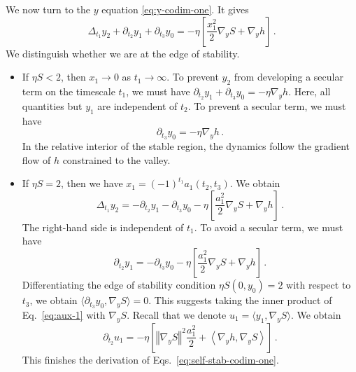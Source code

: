 \documentclass[11pt,english,reqno]{article}
\theoremstyle{plain}
\theoremstyle{definition}
\theoremstyle{remark}
\numberwithin{equation}{section}
\begin{document}
        We now turn to the $y$ equation \eqref{eq:y-codim-one}. It gives
        \begin{equation*}
            \Delta_{t_1} y_2 + \partial_{t_2} y_1 + \partial_{t_3} y_0 = - \eta \left[\frac{x_1^2}{2} \nabla_y S + \nabla_y h\right] \, .
        \end{equation*}
        We distinguish whether we are at the edge of stability.
        \begin{itemize}
            \item If $\eta S < 2$, then $x_1 \to 0$ as $t_1 \to \infty$. To prevent $y_2$ from developing a secular term on the timescale $t_1$, we must have
                $\partial_{t_2} y_1 + \partial_{t_3} y_0 = - \eta \nabla_y h$.
            Here, all quantities but $y_1$ are independent of $t_2$. To prevent a secular term, we must have 
            \begin{equation*}
                \partial_{t_3} y_0 = - \eta \nabla_y h \, .
            \end{equation*}
            In the relative interior of the stable region, the dynamics follow the gradient flow of $h$ constrained to the valley.

            \item If $\eta S = 2$, then we have $x_1 = (-1)^{t_1} a_1(t_2, t_3)$. We obtain
            \begin{equation*}
                \Delta_{t_1} y_2  = - \partial_{t_2} y_1 - \partial_{t_3} y_0- \eta \left[\frac{a_1^2}{2} \nabla_y S + \nabla_y h\right] \, .
            \end{equation*}
            The right-hand side is independent of $t_1$. To avoid a secular term, we must have 
            \begin{equation}
                \label{eq:aux-1}
                \partial_{t_2} y_1 = - \partial_{t_3} y_0- \eta \left[\frac{a_1^2}{2} \nabla_y S + \nabla_y h\right] \, .
            \end{equation}
            Differentiating the edge of stability condition $\eta S(0,y_0) = 2$ with respect to $t_3$, we obtain $\langle \partial_{t_3} y_0, \nabla_y S \rangle = 0$. This suggests taking the inner product of Eq.~\eqref{eq:aux-1} with $\nabla_y S$. Recall that we denote $u_1 = \langle y_1, \nabla_y S \rangle$. We obtain
            \begin{equation*}
                \partial_{t_2} u_1 = - \eta \left[\left\Vert \nabla_y S \right\Vert^2 \frac{a_1^2}{2} + \left\langle \nabla_y h, \nabla_y S  \right\rangle\right] \, .
            \end{equation*}
            This finishes the derivation of Eqs.~\eqref{eq:self-stab-codim-one}.


\end{itemize}
\end{document}
